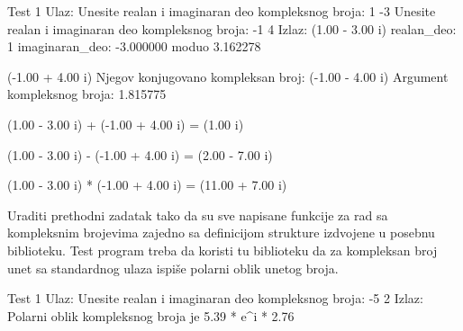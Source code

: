 \begin{Exercise}[label=001]
\begin{maxitest}
\begin{test}{Test 1}
Ulaz:    Unesite realan i imaginaran deo kompleksnog broja: 1 -3 
         Unesite realan i imaginaran deo kompleksnog broja: -1 4 
Izlaz:    (1.00 - 3.00 i)
          realan_deo: 1
          imaginaran_deo: -3.000000
          moduo 3.162278

          (-1.00 + 4.00 i)
          Njegov konjugovano kompleksan broj: (-1.00 - 4.00 i)
          Argument kompleksnog broja: 1.815775

          (1.00 - 3.00 i) + (-1.00 + 4.00 i)  =  (1.00 i)

          (1.00 - 3.00 i) - (-1.00 + 4.00 i)  =  (2.00 - 7.00 i)

          (1.00 - 3.00 i) * (-1.00 + 4.00 i)  =  (11.00 + 7.00 i)
\end{test}
\end{maxitest}


\end{Exercise}
\begin{Answer}[ref=001]
\end{Answer}

\begin{Exercise}[label=002] %
Uraditi prethodni zadatak tako da su sve napisane funkcije za rad sa kompleksnim brojevima zajedno sa definicijom strukture  izdvojene u posebnu biblioteku. Test program treba da koristi tu biblioteku da za kompleksan broj unet sa standardnog ulaza ispiše polarni oblik unetog broja.

\begin{maxitest}
\begin{test}{Test 1}
Ulaz:   Unesite realan i imaginaran deo kompleksnog broja: -5 2 
Izlaz:   Polarni oblik kompleksnog broja je 5.39 *  e^i * 2.76
\end{test}
\end{maxitest}


\end{Exercise}
\begin{Answer}[ref=002]
\end{Answer}


